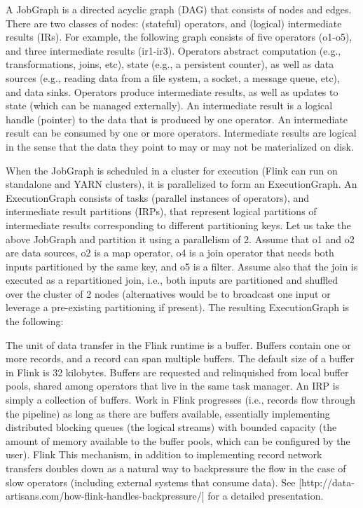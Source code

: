 \documentclass{sig-alternate}
\begin{document}
A JobGraph is a directed acyclic graph (DAG) that consists of nodes and edges. There are two classes of nodes: (stateful) operators, and (logical) intermediate results (IRs). For example, the following graph consists of five operators (o1-o5), and three intermediate results (ir1-ir3). Operators abstract computation (e.g., transformations, joins, etc), state (e.g., a persistent counter), as well as data sources (e.g., reading data from a file system, a socket, a message queue, etc), and data sinks. Operators produce intermediate results, as well as updates to state (which can be managed externally). An intermediate result is a logical handle (pointer) to the data that is produced by one operator. An intermediate result can be consumed by one or more operators. Intermediate results are logical in the sense that the data they point to may or may not be materialized on disk.



When the JobGraph is scheduled in a cluster for execution (Flink can run on standalone and YARN clusters), it is parallelized to form an ExecutionGraph. An ExecutionGraph consists of tasks (parallel instances of operators), and intermediate result partitions (IRPs), that represent logical partitions of intermediate results corresponding to different partitioning keys. Let us take the above JobGraph and partition it using a parallelism of 2. Assume that o1 and o2 are data sources, o2 is a map operator, o4 is a join operator that needs both inputs partitioned by the same key, and o5 is a filter. Assume also that the join is executed as a repartitioned join, i.e., both inputs are partitioned and shuffled over the cluster of 2 nodes (alternatives would be to broadcast one input or leverage a pre-existing partitioning if present). The resulting ExecutionGraph is the following:



The unit of data transfer in the Flink runtime is a buffer. Buffers contain one or more records, and a record can span multiple buffers. The default size of a buffer in Flink is 32 kilobytes. Buffers are requested and relinquished from local buffer pools, shared among operators that live in the same task manager. An IRP is simply a collection of buffers. Work in Flink progresses (i.e., records flow through the pipeline) as long as there are buffers available, essentially implementing distributed blocking queues (the logical streams) with bounded capacity (the amount of memory available to the buffer pools, which can be configured by the user). Flink  This mechanism, in addition to implementing record network transfers doubles down as a natural way to backpressure the flow in the case of slow operators (including external systems that consume data). See [http://data-artisans.com/how-flink-handles-backpressure/] for a detailed presentation. 
\end{document}
